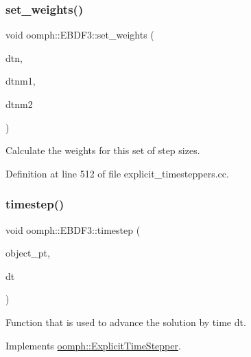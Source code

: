 \mbox{\label{classoomph_1_1EBDF3_a742b80449f93d0fa1604891b19e58110}} 
\subsubsection{\texorpdfstring{set\+\_\+weights()}{set\_weights()}}
{\footnotesize\ttfamily void oomph\+::\+E\+B\+D\+F3\+::set\+\_\+weights (\begin{DoxyParamCaption}\item[{const double \&}]{dtn,  }\item[{const double \&}]{dtnm1,  }\item[{const double \&}]{dtnm2 }\end{DoxyParamCaption})}



Calculate the weights for this set of step sizes. 



Definition at line 512 of file explicit\+\_\+timesteppers.\+cc.

\mbox{\label{classoomph_1_1EBDF3_a273b7eaa19d2e95d6392e6d8dc2970d9}} 
\subsubsection{\texorpdfstring{timestep()}{timestep()}}
{\footnotesize\ttfamily void oomph\+::\+E\+B\+D\+F3\+::timestep (\begin{DoxyParamCaption}\item[{\hyperlink{classoomph_1_1ExplicitTimeSteppableObject}{Explicit\+Time\+Steppable\+Object} $\ast$const \&}]{object\+\_\+pt,  }\item[{const double \&}]{dt }\end{DoxyParamCaption})\hspace{0.3cm}{\ttfamily [virtual]}}



Function that is used to advance the solution by time dt. 



Implements \hyperlink{classoomph_1_1ExplicitTimeStepper_ab43bbab17960d0f50b8842e996f5c765}{oomph\+::\+Explicit\+Time\+Stepper}.



